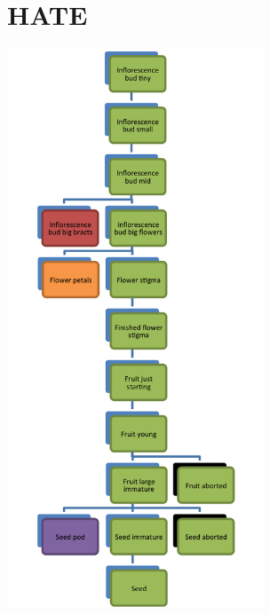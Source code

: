 \documentclass[10pt]{book} %
\begin{document}
\section{HATE}
\begin{multicols}{2}
\includegraphics[width=3in]{HATE.png}
\vfill
\columnbreak


\end{multicols}

\clearpage
\newpage
\end{document}

